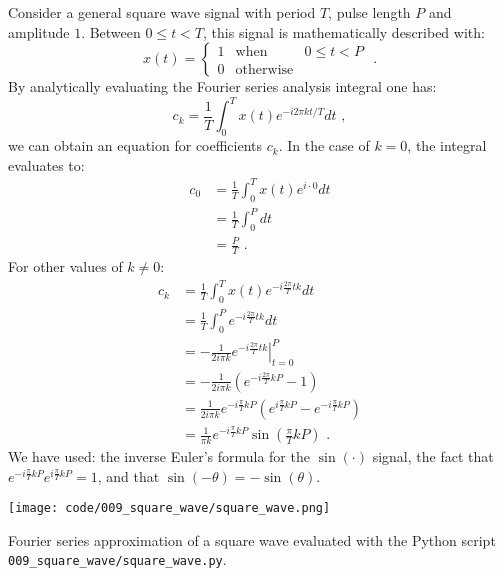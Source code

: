 Consider a general square wave signal with period $T$, pulse length $P$ and amplitude $1$. Between $0\le t < T$,
this signal is mathematically described with:
\begin{equation}
  x(t) = \left\{ \begin{array}{ccl}
    1 & \mathrm{when}      & 0 \le t < P \\
    0 & \mathrm{otherwise} &
  \end{array}
  \right. \,\,.
\end{equation}
By analytically evaluating the Fourier series analysis integral one has:
\begin{equation}
  c_k = \frac{1}{T}\int_0^T x(t) e^{-i 2\pi k t/T} dt \,\,,
\end{equation}
we can obtain an equation for coefficients $c_k$. In the case of $k=0$, the integral evaluates to:
\begin{align}
  c_0 & = \frac{1}{T}\int_0^{T} x(t) e^{i\cdot 0}dt \\
      & = \frac{1}{T}\int_0^{P}  dt                 \\
      & = \frac{P}{T} \,\,.\label{eq:pulsecoeff0}
\end{align}
For other values of $k\ne 0$:
\begin{align}
  c_k & = \frac{1}{T}\int_0^{T} x(t) e^{-i\frac{2\pi}{T} t k}dt                                                   \\
      & =  \frac{1}{T}\int_0^{P}  e^{-i\frac{2\pi}{T} t k}dt                                                      \\
      & = \left.-\frac{1 }{2i \pi k}e^{-i\frac{2\pi}{T}  t k}\right\vert_{t=0}^{P}                                \\
      & = -\frac{1}{2i\pi k}\left(e^{-i\frac{2\pi}{T}  k P} - 1\right)                                            \\
      & = \frac{1}{2i\pi k}e^{-i\frac{\pi}{T}  k P}\left(e^{i \frac{\pi}{T} kP} - e^{-i \frac{\pi}{T} kP} \right) \\
      & =  \frac{1}{\pi k}e^{-i\frac{\pi}{T}  k P}\sin\left(\frac{\pi}{T} kP\right) \,\,.\label{eq:pulsecoeff1}
\end{align}
We have used: the inverse Euler's formula for the $\sin(\cdot)$ signal, the fact
that $e^{-i\frac{\pi}{T} k P}e^{i\frac{\pi}{T} k P}=1$, and that $\sin(-\theta)=-\sin(\theta)$.

\begin{marginfigure}
  \begin{center}
    \texttt{[image: code/009\_square\_wave/square\_wave.png]}
  \end{center}
  \caption{Fourier series approximation of a square wave evaluated with the Python script \texttt{009\_square\_wave/square\_wave.py}.}
  \label{fig:square_wave_python}
\end{marginfigure}

